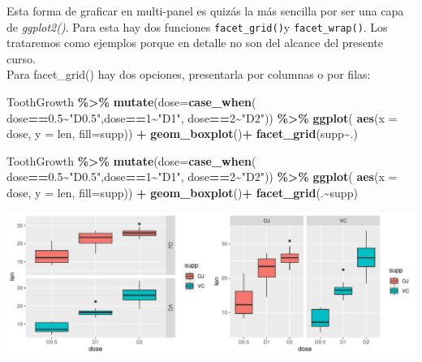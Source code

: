 \documentclass[
]{book}
\newenvironment{Shaded}{\begin{snugshade}}{\end{snugshade}}
\newcommand{\AttributeTok}[1]{\textcolor[rgb]{0.13,0.29,0.53}{#1}}
\newcommand{\DecValTok}[1]{\textcolor[rgb]{0.00,0.00,0.81}{#1}}
\newcommand{\FloatTok}[1]{\textcolor[rgb]{0.00,0.00,0.81}{#1}}
\newcommand{\FunctionTok}[1]{\textcolor[rgb]{0.13,0.29,0.53}{\textbf{#1}}}
\newcommand{\NormalTok}[1]{#1}
\newcommand{\SpecialCharTok}[1]{\textcolor[rgb]{0.81,0.36,0.00}{\textbf{#1}}}
\newcommand{\StringTok}[1]{\textcolor[rgb]{0.31,0.60,0.02}{#1}}
\begin{document}
\hfill\break
Esta forma de graficar en multi-panel es quizás la más sencilla por ser una capa de \emph{ggplot2()}. Para esta hay dos funciones \texttt{facet\_grid()}y \texttt{facet\_wrap()}. Los trataremos como ejemplos porque en detalle no son del alcance del presente curso.\\

Para facet\_grid() hay dos opciones, presentarla por columnas o por filas:\\

\begin{Shaded}
\begin{Highlighting}[]
\NormalTok{ToothGrowth }\SpecialCharTok{\%\textgreater{}\%}  \FunctionTok{mutate}\NormalTok{(}\AttributeTok{dose=}\FunctionTok{case\_when}\NormalTok{(}
\NormalTok{  dose}\SpecialCharTok{==}\FloatTok{0.5}\SpecialCharTok{\textasciitilde{}}\StringTok{"D0.5"}\NormalTok{,dose}\SpecialCharTok{==}\DecValTok{1}\SpecialCharTok{\textasciitilde{}}\StringTok{"D1"}\NormalTok{, dose}\SpecialCharTok{==}\DecValTok{2}\SpecialCharTok{\textasciitilde{}}\StringTok{"D2"}\NormalTok{)) }\SpecialCharTok{\%\textgreater{}\%} \FunctionTok{ggplot}\NormalTok{(}
    \FunctionTok{aes}\NormalTok{(}\AttributeTok{x =}\NormalTok{ dose, }\AttributeTok{y =}\NormalTok{ len, }\AttributeTok{fill=}\NormalTok{supp)) }\SpecialCharTok{+}  \FunctionTok{geom\_boxplot}\NormalTok{()}\SpecialCharTok{+} 
  \FunctionTok{facet\_grid}\NormalTok{(supp}\SpecialCharTok{\textasciitilde{}}\NormalTok{.)}


\NormalTok{ToothGrowth }\SpecialCharTok{\%\textgreater{}\%}  \FunctionTok{mutate}\NormalTok{(}\AttributeTok{dose=}\FunctionTok{case\_when}\NormalTok{(}
\NormalTok{  dose}\SpecialCharTok{==}\FloatTok{0.5}\SpecialCharTok{\textasciitilde{}}\StringTok{"D0.5"}\NormalTok{,dose}\SpecialCharTok{==}\DecValTok{1}\SpecialCharTok{\textasciitilde{}}\StringTok{"D1"}\NormalTok{, dose}\SpecialCharTok{==}\DecValTok{2}\SpecialCharTok{\textasciitilde{}}\StringTok{"D2"}\NormalTok{)) }\SpecialCharTok{\%\textgreater{}\%} \FunctionTok{ggplot}\NormalTok{(}
    \FunctionTok{aes}\NormalTok{(}\AttributeTok{x =}\NormalTok{ dose, }\AttributeTok{y =}\NormalTok{ len, }\AttributeTok{fill=}\NormalTok{supp)) }\SpecialCharTok{+}  \FunctionTok{geom\_boxplot}\NormalTok{()}\SpecialCharTok{+} 
  \FunctionTok{facet\_grid}\NormalTok{(.}\SpecialCharTok{\textasciitilde{}}\NormalTok{supp)}
\end{Highlighting}
\end{Shaded}

\begin{center}\includegraphics{_main_files/figure-latex/unnamed-chunk-221-1} \end{center}
\end{document}
